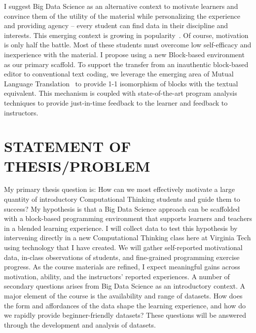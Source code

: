 \documentclass{sig-alternate}
\begin{document}
I suggest Big Data Science as an alternative context to motivate learners and convince them of the utility of the material while personalizing the experience and providing agency -- every student can find data in their discipline and interests. This emerging context is growing in popularity~\cite{anderson}. Of course, motivation is only half the battle. Most of these students must overcome low self-efficacy and inexperience with the material. I propose using a new Block-based environment as our primary scaffold. To support the transfer from an inauthentic block-based editor to conventional text coding, we leverage the emerging area of Mutual Language Translation~\cite{mlt} to provide 1-1 isomorphism of blocks with the textual equivalent. This mechanism is coupled with state-of-the-art program analysis techniques to provide just-in-time feedback to the learner and feedback to instructors.



\section{STATEMENT OF THESIS/PROBLEM}
My primary thesis question is: How can we most effectively motivate a large quantity of introductory Computational Thinking students and guide them to success? My hypothesis is that a Big Data Science approach can be scaffolded with a block-based programming environment that supports learners and teachers in a blended learning experience. I will collect data to test this hypothesis by intervening directly in a new Computational Thinking class here at Virginia Tech using technology that I have created. We will gather self-reported motivational data, in-class observations of students, and fine-grained programming exercise progress. As the course materials are refined, I expect meaningful gains across motivation, ability, and the instructors' reported experiences.
A number of secondary questions arises from Big Data Science as an introductory context. A major element of the course is the availability and range of datasets. How does the form and affordances of the data shape the learning experience, and how do we rapidly provide beginner-friendly datasets? These questions will be answered through the development and analysis of datasets.


\balance
\end{document}
